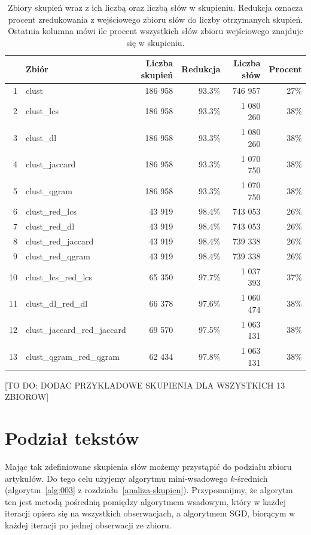 \documentclass{praca1}
\begin{document}
\begin{table}[!h]
\centering
\begin{tabular}{|rl|rr|rr|}
  \hline
 & Zbiór & Liczba skupień & Redukcja & Liczba słów & Procent \\ 
  \hline
1 & clust & 186 958 & 93.3\% & 746 957 & 27\% \\ 
  2 & clust\_lcs & 186 958 & 93.3\% & 1 080 260 & 38\% \\ 
  3 & clust\_dl & 186 958 & 93.3\% & 1 080 260 & 38\% \\ 
  4 & clust\_jaccard & 186 958 & 93.3\% & 1 070 750 & 38\% \\ 
  5 & clust\_qgram & 186 958 & 93.3\% & 1 070 750 & 38\% \\ \hline
  6 & clust\_red\_lcs & 43 919 & 98.4\% & 743 053 & 26\% \\ 
  7 & clust\_red\_dl & 43 919 & 98.4\% & 743 053 & 26\% \\ 
  8 & clust\_red\_jaccard & 43 919 & 98.4\% & 739 338 & 26\% \\ 
  9 & clust\_red\_qgram & 43 919 & 98.4\% & 739 338 & 26\% \\ \hline
  10 & clust\_lcs\_red\_lcs & 65 350 & 97.7\% & 1 037 393 & 37\% \\ 
  11 & clust\_dl\_red\_dl & 66 378 & 97.6\% & 1 060 474 & 38\% \\ 
  12 & clust\_jaccard\_red\_jaccard & 69 570 & 97.5\% & 1 063 131 & 38\% \\ 
  13 & clust\_qgram\_red\_qgram & 62 434 & 97.8\% & 1 063 131 & 38\% \\ 
   \hline
\end{tabular}
\caption{Zbiory skupień wraz z ich liczbą oraz liczbą słów w skupieniu. Redukcja oznacza procent zredukowania z wejściowego zbioru słów do liczby otrzymanych skupień. Ostatnia kolumna mówi ile procent wszystkich słów zbioru wejściowego znajduje się w skupieniu.}
\label{tab:005}
\end{table}

[TO DO: DODAC PRZYKLADOWE SKUPIENIA DLA WSZYSTKICH 13 ZBIOROW]

\section{Podział tekstów}

Mając tak zdefiniowane skupienia słów możemy przystąpić do podziału zbioru artykułów. Do tego celu użyjemy algorytmu mini-wsadowego $k$-średnich (algorytm~\ref{alg:003} z rozdziału~\ref{analiza-skupien}). Przypomnijmy, że algorytm ten jest metodą pośrednią pomiędzy algorytmem wsadowym, który w każdej iteracji opiera się na wszystkich obserwacjach, a algorytmem SGD, biorącym w każdej iteracji po jednej obserwacji ze zbioru. 
\end{document}

